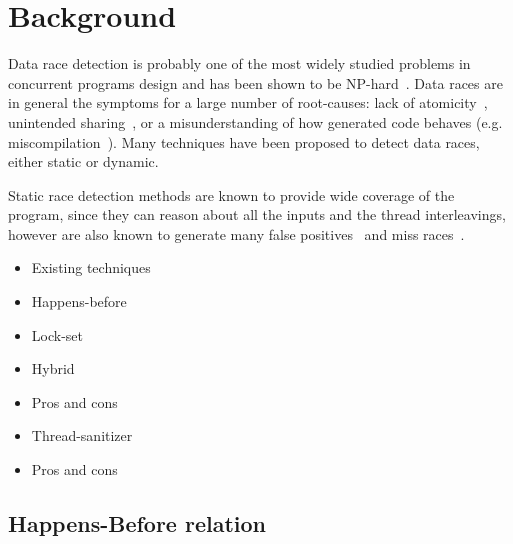 \section{Background}
\label{sec:background}

Data race detection is probably one of the most widely studied problems in
concurrent programs design and has been shown to be
NP-hard~\cite{netzer-miller}.
%
Data races are in general the symptoms for a large number of root-causes: lack
of atomicity~\cite{usenix-race-erickson-et-al}, unintended
sharing~\cite{race-rv-2012-talk}, or a misunderstanding of how generated code
behaves (e.g. miscompilation~\cite{Boehm:2011:MPB:2001252.2001255}).
%
Many techniques have been proposed to detect data races, either static or
dynamic.

Static race detection methods are known to provide wide coverage of the
program, since they can reason about all the inputs and the thread
interleavings, however are also known to generate many false
positives~\cite{Pratikakis:2011:LPS:1889997.1890000} and miss
races~\cite{Voung:2007:RSR:1287624.1287654}.

\begin{itemize}
\item Existing techniques
\item Happens-before
\item Lock-set
\item Hybrid
\item Pros and cons
\item Thread-sanitizer
\item Pros and cons
\end{itemize}

\subsection{Happens-Before relation}
\label{subsec:happensbefore}



